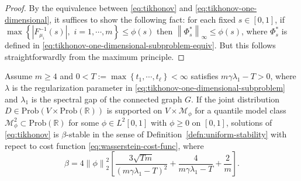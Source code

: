 \documentclass[letterpaper]{article} %
\begin{document}
\begin{proof}
  By the equivalence between \eqref{eq:tikhonov} and \eqref{eq:tikhonov-one-dimensional}, it suffices to show the following fact: for each fixed $s\in \left[ 0,1 \right]$, if $\max \left\{ \left|F_{\mu_i}^{-1} \left( s \right)\right|,\,\,i=1,\cdots,m\right\}\leq \phi \left( s \right)$ then $\left\|\Phi_s^{*}\right\|_{\infty}\leq \phi \left( s \right)$, where $\Phi_s^{*}$ is defined in \eqref{eq:tikhonov-one-dimensional-subproblem-equiv}. But this follows straightforwardly from the maximum principle.
\end{proof}

\begin{proposition}
  \label{prop:alg-stability-slp}
  Assume $m\geq 4$ and $0<T:=\max \left\{ t_1,\cdots,t_{\ell} \right\}<\infty$ satisfies $m\gamma\lambda_1-T>0$, where $\lambda$ is the regularization parameter in \eqref{eq:tikhonov-one-dimensional-subproblem} and $\lambda_1$ is the spectral gap of the connected graph $G$. If the joint distribution $D\in\mathrm{Prob}\left( V\times \mathrm{Prob}\left( \mathbb{R} \right) \right)$ is supported on $V\times \mathcal{M}_{\phi}$ for a quantile model class $\mathcal{M}_{\phi}^2\subset \mathrm{Prob}\left( \mathbb{R} \right)$ for some $\phi\in L^2 \left[ 0,1 \right]$ with $\phi\geq 0$ on $\left[ 0,1 \right]$, solutions of \eqref{eq:tikhonov} is $\beta$-stable in the sense of Definition~\ref{defn:uniform-stability} with repect to cost function \eqref{eq:wasserstein-cost-func}, where
  \begin{equation*}
    \beta=4\left\| \phi \right\|_2^2\left[\frac{3\sqrt{Tm}}{\left( m\gamma\lambda_1-T \right)^2}+\frac{4}{m\gamma\lambda_1-T}+\frac{2}{m}\right].
  \end{equation*}
\end{proposition}
\end{document}

